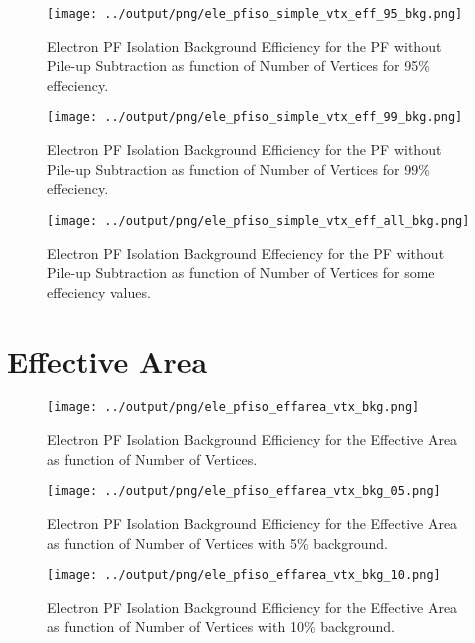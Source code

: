 \documentclass[11pt]{book}
\begin{document}
\begin{figure}[htb]
\centering
\texttt{[image: ../output/png/ele\_pfiso\_simple\_vtx\_eff\_95\_bkg.png]}
\caption{Electron PF Isolation Background Efficiency for the PF without Pile-up Subtraction as function of Number of Vertices for 95\% effeciency.}
\label{fig:ele_pfiso_vtx_eff_simple_eff_95_bkg}
\end{figure}

\begin{figure}[htb]
\centering
\texttt{[image: ../output/png/ele\_pfiso\_simple\_vtx\_eff\_99\_bkg.png]}
\caption{Electron PF Isolation Background Efficiency for the PF without Pile-up Subtraction as function of Number of Vertices for 99\% effeciency.}
\label{fig:ele_pfiso_vtx_eff_simple_eff_99_bkg}
\end{figure}

\begin{figure}[htb]
\centering
\texttt{[image: ../output/png/ele\_pfiso\_simple\_vtx\_eff\_all\_bkg.png]}
\caption{Electron PF Isolation Background Effeciency for the PF without Pile-up Subtraction as function of Number of Vertices for some effeciency values.}
\label{fig:ele_pfiso_vtx_eff_simple_eff_all_bkg}
\end{figure}
\clearpage

\section{Effective Area}
\begin{figure}[htb]
\centering
\texttt{[image: ../output/png/ele\_pfiso\_effarea\_vtx\_bkg.png]}
\caption{Electron PF Isolation Background Efficiency for the Effective Area as function of Number of Vertices.}
\label{fig:ele_pfiso_vtx_bkg_effarea}
\end{figure}

\begin{figure}[htb]
\centering
\texttt{[image: ../output/png/ele\_pfiso\_effarea\_vtx\_bkg\_05.png]}
\caption{Electron PF Isolation Background Efficiency for the Effective Area as function of Number of Vertices with 5\% background.}
\label{fig:ele_pfiso_vtx_bkg_effarea_bkg_05}
\end{figure}

\begin{figure}[htb]
\centering
\texttt{[image: ../output/png/ele\_pfiso\_effarea\_vtx\_bkg\_10.png]}
\caption{Electron PF Isolation Background Efficiency for the Effective Area as function of Number of Vertices with 10\% background.}
\label{fig:ele_pfiso_vtx_bkg_effarea_bkg_10}
\end{figure}
\end{document}
